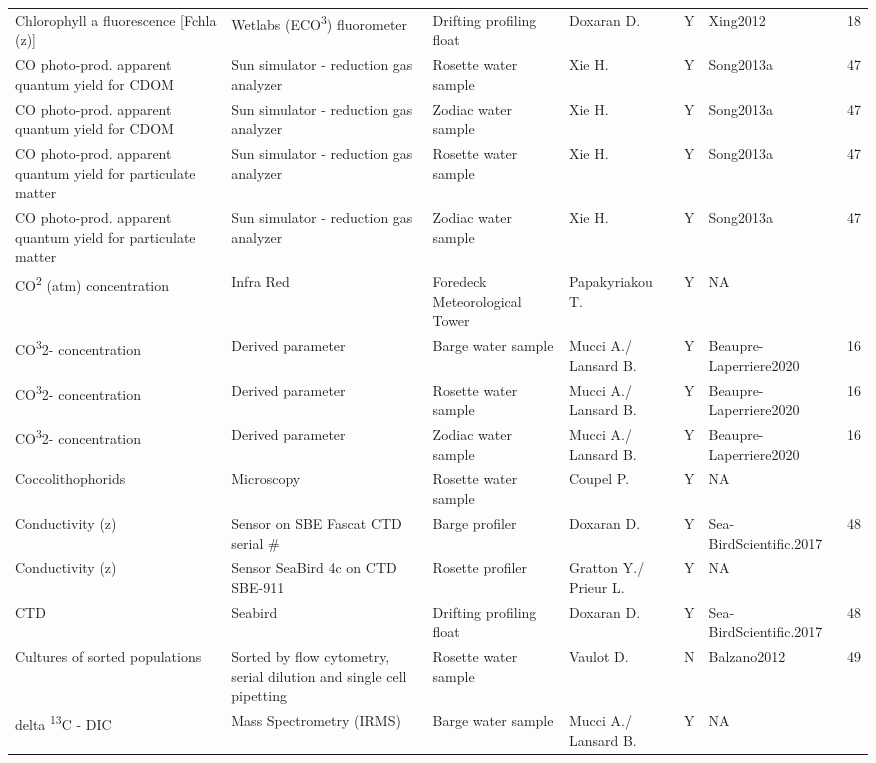 \begin{ThreePartTable}
\begin{longtable}[t]{lllllll}
Chlorophyll a fluorescence [Fchla (z)] & Wetlabs (ECO\textsuperscript{3}) fluorometer & Drifting profiling float & Doxaran D. & Y & Xing2012 & 18\\
CO photo-prod. apparent quantum yield for CDOM & Sun simulator - reduction gas analyzer & Rosette water sample & Xie H. & Y & Song2013a & 47\\
\addlinespace
CO photo-prod. apparent quantum yield for CDOM & Sun simulator - reduction gas analyzer & Zodiac water sample & Xie H. & Y & Song2013a & 47\\
CO photo-prod. apparent quantum yield for particulate matter & Sun simulator - reduction gas analyzer & Rosette water sample & Xie H. & Y & Song2013a & 47\\
CO photo-prod. apparent quantum yield for particulate matter & Sun simulator - reduction gas analyzer & Zodiac water sample & Xie H. & Y & Song2013a & 47\\
CO\textsuperscript{2} (atm) concentration & Infra Red & Foredeck Meteorological Tower & Papakyriakou T. & Y & NA & \\
CO\textsuperscript{3}2- concentration & Derived parameter & Barge water sample & Mucci A./ Lansard B. & Y & Beaupre-Laperriere2020 & 16\\
\addlinespace
CO\textsuperscript{3}2- concentration & Derived parameter & Rosette water sample & Mucci A./ Lansard B. & Y & Beaupre-Laperriere2020 & 16\\
CO\textsuperscript{3}2- concentration & Derived parameter & Zodiac water sample & Mucci A./ Lansard B. & Y & Beaupre-Laperriere2020 & 16\\
Coccolithophorids & Microscopy & Rosette water sample & Coupel P. & Y & NA & \\
Conductivity (z) & Sensor on SBE Fascat CTD serial \# & Barge profiler & Doxaran D. & Y & Sea-BirdScientific.2017 & 48\\
Conductivity (z) & Sensor SeaBird 4c on CTD SBE-911 & Rosette profiler & Gratton Y./ Prieur L. & Y & NA & \\
\addlinespace
CTD & Seabird & Drifting profiling float & Doxaran D. & Y & Sea-BirdScientific.2017 & 48\\
Cultures of sorted populations & Sorted by flow cytometry, serial dilution and single cell pipetting & Rosette water sample & Vaulot D. & N & Balzano2012 & 49\\
delta \textsuperscript{13}C - DIC & Mass Spectrometry (IRMS) & Barge water sample & Mucci A./ Lansard B. & Y & NA & \\

\end{longtable}
\end{ThreePartTable}
